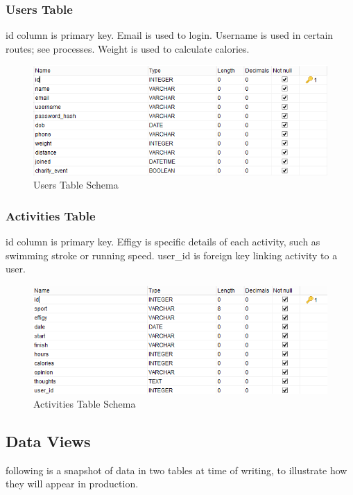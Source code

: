 \documentclass{article}[12pt,a4paper]
\begin{document}
\subsubsection{Users Table}
id column is primary key. Email is used to login. Username is used in certain routes; see processes. Weight is used to calculate calories.
\begin{figure}[h!]
  \includegraphics[scale=0.65]{images/database/users_schema}
  \caption{Users Table Schema}
\end{figure}

\subsubsection{Activities Table}
id column is primary key. Effigy is specific details of each activity, such as swimming stroke or running speed. user\_id is foreign key linking activity to a user.
\begin{figure}[h!]
  \includegraphics[scale=0.65]{images/database/activities_schema}
  \caption{Activities Table Schema}
\end{figure}

\clearpage

\subsection{Data Views}
following is a snapshot of data in two tables at time of writing, to illustrate how they will appear in production.
\end{document}
